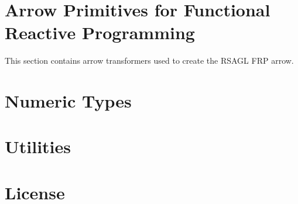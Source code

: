 \documentclass{article}
\begin{document}
\part{Arrow Primitives for Functional Reactive Programming}

This section contains arrow transformers used to create the RSAGL FRP arrow.






\part{Numeric Types}




\part{Utilities}



\part{License}


\end{document}
